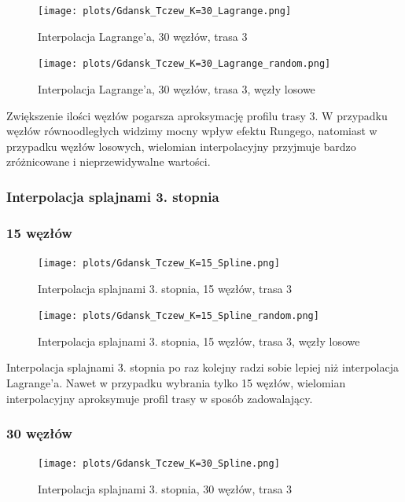 \documentclass{article}
\begin{document}
\begin{figure}[H]
    \centering
    \texttt{[image: plots/Gdansk\_Tczew\_K=30\_Lagrange.png]}
    \caption{Interpolacja Lagrange'a, 30 węzłów, trasa 3}
\end{figure}

\begin{figure}[H]
    \centering
    \texttt{[image: plots/Gdansk\_Tczew\_K=30\_Lagrange\_random.png]}
    \caption{Interpolacja Lagrange'a, 30 węzłów, trasa 3, węzły losowe}
\end{figure}

Zwiększenie ilości węzłów pogarsza aproksymację profilu trasy 3. W przypadku węzłów równoodległych
widzimy mocny wpływ efektu Rungego, natomiast w przypadku węzłów losowych, wielomian interpolacyjny
przyjmuje bardzo zróżnicowane i nieprzewidywalne wartości.

\subsubsection{Interpolacja splajnami 3. stopnia}

\subsubsection*{\hfil 15 węzłów \hfil }

\begin{figure}[H]
    \centering
    \texttt{[image: plots/Gdansk\_Tczew\_K=15\_Spline.png]}
    \caption{Interpolacja splajnami 3. stopnia, 15 węzłów, trasa 3}
\end{figure}

\begin{figure}[H]
    \centering
    \texttt{[image: plots/Gdansk\_Tczew\_K=15\_Spline\_random.png]}
    \caption{Interpolacja splajnami 3. stopnia, 15 węzłów, trasa 3, węzły losowe}
\end{figure}

Interpolacja splajnami 3. stopnia po raz kolejny radzi sobie lepiej niż interpolacja Lagrange'a.
Nawet w przypadku wybrania tylko 15 węzłów, wielomian interpolacyjny aproksymuje profil trasy
w sposób zadowalający.

\subsubsection*{\hfil 30 węzłów \hfil }

\begin{figure}[H]
    \centering
    \texttt{[image: plots/Gdansk\_Tczew\_K=30\_Spline.png]}
    \caption{Interpolacja splajnami 3. stopnia, 30 węzłów, trasa 3}
\end{figure}
\end{document}
